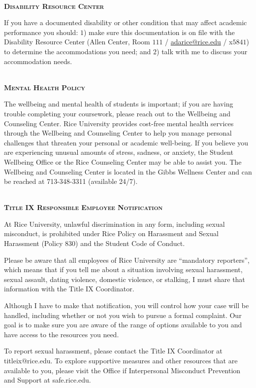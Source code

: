 \documentclass[11pt]{article}
\begin{document}
~\\
\textbf{\textsc{Disability Resource Center}}
\begin{adjustwidth}{1cm}{0cm}
  If you have a documented disability or other condition that may affect academic performance you should: $1$) make sure this documentation is on file with the Disability Resource Center (Allen Center, Room $111$ / \href{mailto:adarice@rice.edu}{adarice@rice.edu} / x$5841$) to determine the accommodations you need; and $2$) talk with me to discuss your accommodation needs.
\end{adjustwidth}

~\\
\textbf{\textsc{Mental Health Policy}}
\begin{adjustwidth}{1cm}{0cm}
	The wellbeing and mental health of students is important; if you are having trouble completing your coursework, please reach out to the Wellbeing and Counseling Center. Rice University provides cost-free mental health services through the Wellbeing and Counseling Center to help you manage personal challenges that threaten your personal or academic well-being. If you believe you are experiencing unusual amounts of stress, sadness, or anxiety, the Student Wellbeing Office or the Rice Counseling Center may be able to assist you. The Wellbeing and Counseling Center is located in the Gibbs Wellness Center and can be reached at 713-348-3311 (available 24/7).
\end{adjustwidth}

~\\
\textbf{\textsc{Title IX Responsible Employee Notification}}
\begin{adjustwidth}{1cm}{0cm}
  At Rice University, unlawful discrimination in any form, including sexual misconduct, is prohibited under Rice Policy on Harassment and Sexual Harassment (Policy 830) and the Student Code of Conduct.

  Please be aware that all employees of Rice University are ``mandatory reporters'', which means that if you tell me about a situation involving sexual harassment, sexual assault, dating violence, domestic violence, or stalking, I must share that information with the Title IX Coordinator.

  Although I have to make that notification, you will control how your case will be handled, including whether or not you wish to pursue a formal complaint. Our goal is to make sure you are aware of the range of options available to you and have access to the resources you need.

  To report sexual harassment, please contact the Title IX Coordinator at titleix@rice.edu. To explore supportive measures and other resources that are available to you, please visit the Office if Interpersonal Misconduct Prevention and Support at safe.rice.edu.
\end{adjustwidth}
\end{document}
